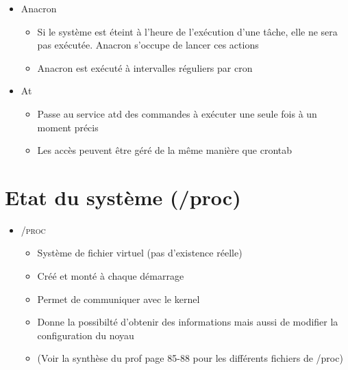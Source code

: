 \documentclass[a4paper]{article}
\begin{document}
\begin{itemize}[label = \textbullet, font = \Large]
        \item Anacron
        \begin{itemize}[label=, font=\scriptsize] 
          \item Si le système est éteint à l’heure de l’exécution d’une tâche, elle ne sera pas exécutée. Anacron s’occupe de
          lancer ces actions
          \item Anacron est exécuté à intervalles réguliers par cron
        \end{itemize}
        \item At
        \begin{itemize}[label=, font=\scriptsize] 
          \item Passe au service atd des commandes à exécuter une seule fois à un moment précis
          \item Les accès peuvent être géré de la même manière que crontab
        \end{itemize}
      \end{itemize}

      \section{Etat du système (/proc)}
      \begin{itemize}[label = \textbullet, font = \Large]
        \item \textsc{/proc}
        \begin{itemize}[label=, font=\scriptsize] 
          \item Système de fichier virtuel (pas d'existence réelle)
          \item Créé et monté à chaque démarrage
          \item Permet de communiquer avec le kernel
          \item Donne la possibilté d'obtenir des informations mais aussi de modifier la configuration du noyau
          \item (Voir la synthèse du prof page 85-88 pour les différents fichiers de /proc)
        \end{itemize}
      \end{itemize}
\end{document}
